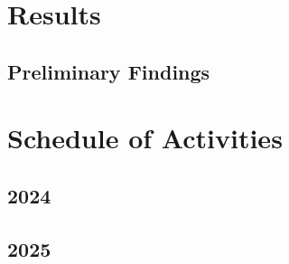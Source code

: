 \documentclass[sigconf]{acmart}
\begin{document}
\section{Results}
\subsection{Preliminary Findings}

\section{Schedule of Activities}
    \subsection{2024}
    \subsection{2025}
\end{document}

